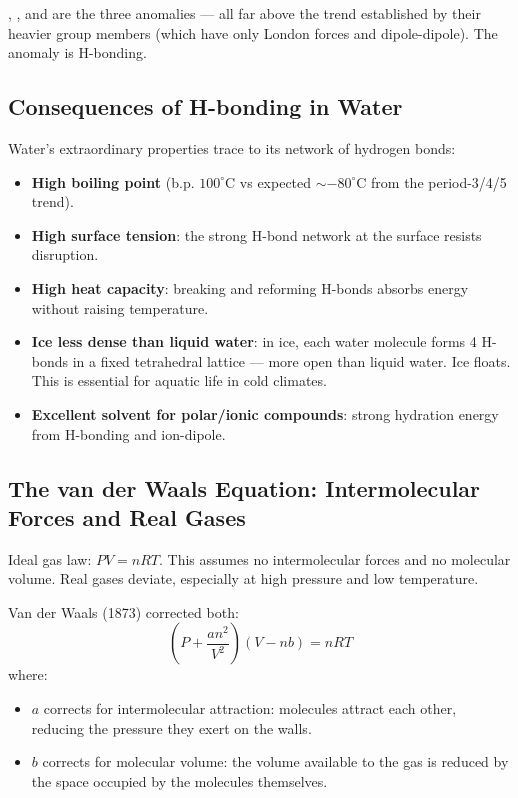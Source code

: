 \documentclass[12pt, a4paper]{book}
\begin{document}
, , and  are the three anomalies ---
all far above the trend established by their heavier
group members (which have only London forces and dipole-dipole).
The anomaly is H-bonding.

\subsection{Consequences of H-bonding in Water}

Water's extraordinary properties trace to its network
of hydrogen bonds:

\begin{itemize}[nosep, leftmargin=2em]
  \item \textbf{High boiling point} (b.p. $100^\circ$C vs expected
        $\sim -80^\circ$C from the period-3/4/5 trend).
  \item \textbf{High surface tension}: the strong H-bond network
        at the surface resists disruption.
  \item \textbf{High heat capacity}: breaking and reforming
        H-bonds absorbs energy without raising temperature.
  \item \textbf{Ice less dense than liquid water}: in ice,
        each water molecule forms 4 H-bonds in a fixed
        tetrahedral lattice --- more open than liquid water.
        Ice floats. This is essential for aquatic life in cold climates.
  \item \textbf{Excellent solvent for polar/ionic compounds}:
        strong hydration energy from H-bonding and ion-dipole.
\end{itemize}

\subsection{The van der Waals Equation: Intermolecular Forces and Real Gases}

Ideal gas law: $PV = nRT$.
This assumes no intermolecular forces and no molecular volume.
Real gases deviate, especially at high pressure and low temperature.

Van der Waals (1873) corrected both:
\[
  \left(P + \frac{an^2}{V^2}\right)(V - nb) = nRT
\]
where:
\begin{itemize}[nosep, leftmargin=2em]
  \item $a$ corrects for intermolecular attraction:
        molecules attract each other, reducing the pressure
        they exert on the walls.
  \item $b$ corrects for molecular volume:
        the volume available to the gas is reduced
        by the space occupied by the molecules themselves.
\end{itemize}
\end{document}
